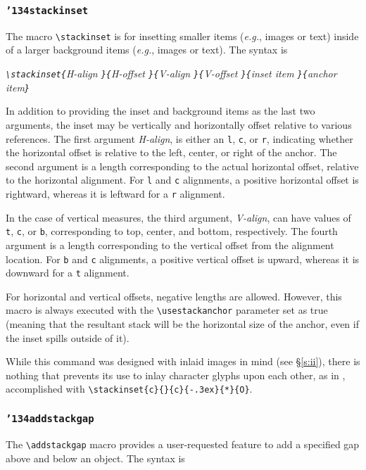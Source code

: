 \documentclass{article}
\let\vb\verb
\newcommand\cmd[1]{\texttt{\char'134#1}}
\begin{document}
\subsubsection{\cmd{stackinset}\label{s:iis}}

The macro \vb|\stackinset| is for insetting
smaller items (\textit{e.g.}, images or text) inside of a larger background
items (\textit{e.g.}, images or text).  The syntax is

\itshape
\vb|\stackinset{|H-align%
  \vb|}{|H-offset%
  \vb|}{|V-align%
  \vb|}{|V-offset%
  \vb|}{|inset item%
  \vb|}{|anchor item\vb|}|
\upshape

In addition to providing the inset and background items as the last two
arguments, the inset may be vertically and horizontally offset relative
to various references.  The first argument \textit{H-align}, is either
an \vb|l|, \vb|c|, or \vb|r|, indicating whether the horizontal offset
is relative to the left, center, or right of the anchor.  The second
argument is a length corresponding to the actual horizontal offset, 
relative to the horizontal alignment.  For \vb|l| and \vb|c| alignments, 
a positive horizontal offset is rightward, whereas it is leftward for
a \vb|r| alignment.

In the case of vertical measures, the third argument, \textit{V-align}, 
can have values of \vb|t|, \vb|c|, or \vb|b|, corresponding to top,
center, and bottom, respectively.  The fourth argument is a length
corresponding to the vertical offset from the alignment location.
For \vb|b| and \vb|c| alignments, a positive vertical offset is upward,
whereas it is downward for a \vb|t| alignment.

For horizontal and vertical offsets, negative lengths are allowed.
However, this macro is always executed with the \vb|\usestackanchor| 
parameter set as true (meaning that the resultant stack will be the
horizontal size of the anchor, even if the inset spills outside of it).

While this command was designed with inlaid images in mind (see
\S\ref{s:ii}), there is nothing that prevents its use to inlay
character glyphs upon each other, as in 
, accomplished with
\vb|\stackinset{c}{}{c}{-.3ex}{*}{O}|.

\subsubsection{\cmd{addstackgap}\label{s:asg}}
\def\stacktype{S}

The \vb|\addstackgap| macro provides a user-requested feature to add a
specified gap above and below an object.  The syntax is
\end{document}
